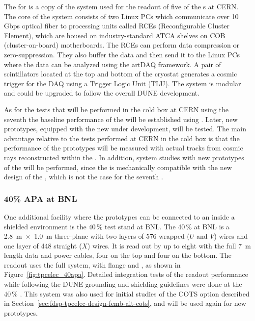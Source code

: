 The  for  is a copy of the system used for the readout
of five of the  s at CERN. The core of the  system 
consists of two Linux PCs which communicate over 10 Gbps optical fiber
to processing units called RCEs (Reconfigurable Cluster Element), which are 
housed on industry-standard ATCA shelves on COB (cluster-on-board) motherboards.
The RCEs can perform data compression or zero-suppression. They also buffer
the data and then send it to the Linux PCs where the data can be analyzed 
using the artDAQ framework. A pair of scintillators located at the top and bottom 
of the cryostat generates a cosmic trigger for the DAQ  using a Trigger Logic Unit (TLU).
The system is modular and could be upgraded to follow the overall DUNE  
development. 

As for the tests that will be performed in the cold box at CERN using the seventh
  the baseline performance of the  
will be established using  . Later, new prototypes, equipped
with the new  under development, will be tested. The main advantage
relative to the tests performed at CERN in the cold box is that the performance of the
 prototypes will be measured with actual tracks from cosmic rays 
reconstructed within the . In addition, system studies with new 
prototypes of the  will be performed, since the  is
mechanically compatible with the new design of the , which is not
the case for the seventh  .


\subsubsection{40\% APA at BNL}
\label{sec:fdsp-tpcelec-qa-facilities-fortypercent}

One additional facility where the  prototypes can be connected to
an  inside a shielded environment is the \num{40}\,\%  
test stand at BNL. The \num{40}\,\%  at BNL is a \SI{2.8}{m}~$\times$~\SI{1.0}{m} 
three-plane  with two layers of \num{576} wrapped ($U$ and $V$) wires 
and one layer of \num{448} straight ($X$) wires. It is read out by up to eight 
 with the full \SI{7}{m}  length data and  power 
cables, four on the top and four on the bottom. The readout uses the full  
system, with  flange and , as shown in Figure~\ref{fig:tpcelec_40apa}. 
Detailed integration tests of the   readout performance while 
following the DUNE grounding and shielding guidelines were done at the \num{40}\,\% 
. This system was also used for initial studies of the COTS 
option described in Section~\ref{sec:fdsp-tpcelec-design-femb-alt-cots}, and will
be used again for new  prototypes.

